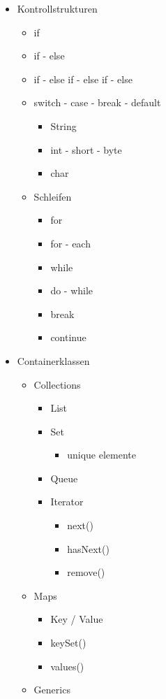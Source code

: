 \begin{itemize}
    \item Kontrollstrukturen
    \begin{itemize}
        \item if
        \item if - else
        \item if - else if - else if - else
        \item switch - case - break - default
        \begin{itemize}
            \item String
            \item int - short - byte
            \item char
        \end{itemize}
        \item Schleifen
        \begin{itemize}
            \item for
            \item for - each
            \item while
            \item do - while
            \item break
            \item continue
        \end{itemize}
    \end{itemize}
    
    \item Containerklassen
    \begin{itemize}
        \item Collections
        \begin{itemize}
            \item List
            \item Set
            \begin{itemize}
                \item unique elemente
            \end{itemize}
            \item Queue
            \item Iterator
            \begin{itemize}
                \item next()
                \item hasNext()
                \item remove()
            \end{itemize}
        \end{itemize}
        \item Maps
        \begin{itemize}
            \item Key / Value
            \item keySet()
            \item values()
        \end{itemize}
        \item Generics
    \end{itemize}
    
\end{itemize}
